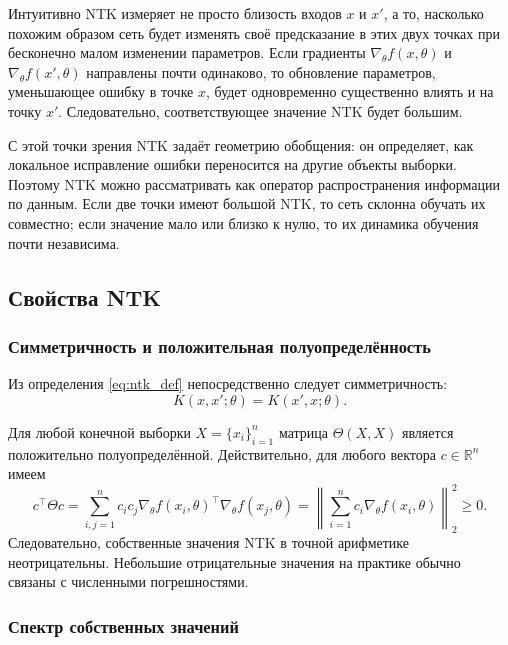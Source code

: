 Интуитивно NTK измеряет не просто близость входов $x$ и $x'$, а то, насколько похожим образом сеть будет изменять своё предсказание в этих двух точках при бесконечно малом изменении параметров. Если градиенты $\nabla_{\theta} f(x,\theta)$ и $\nabla_{\theta} f(x',\theta)$ направлены почти одинаково, то обновление параметров, уменьшающее ошибку в точке $x$, будет одновременно существенно влиять и на точку $x'$. Следовательно, соответствующее значение NTK будет большим.

С этой точки зрения NTK задаёт геометрию обобщения: он определяет, как локальное исправление ошибки переносится на другие объекты выборки. Поэтому NTK можно рассматривать как оператор распространения информации по данным. Если две точки имеют большой NTK, то сеть склонна обучать их совместно; если значение мало или близко к нулю, то их динамика обучения почти независима.

\subsection{Свойства NTK}

\subsubsection{Симметричность и положительная полуопределённость}

Из определения \eqref{eq:ntk_def} непосредственно следует симметричность:
\begin{equation}
    K(x,x';\theta)=K(x',x;\theta).
\end{equation}

Для любой конечной выборки $X=\{x_i\}_{i=1}^{n}$ матрица $\Theta(X,X)$ является положительно полуопределённой. Действительно, для любого вектора $c \in \mathbb{R}^n$ имеем
\begin{equation}
    c^{\top}\Theta c
    =\sum_{i,j=1}^{n}c_i c_j \nabla_{\theta}f(x_i,\theta)^{\top}\nabla_{\theta}f(x_j,\theta)
    =\left\|\sum_{i=1}^{n} c_i \nabla_{\theta}f(x_i,\theta)\right\|_2^2 \ge 0.
\end{equation}
Следовательно, собственные значения NTK в точной арифметике неотрицательны. Небольшие отрицательные значения на практике обычно связаны с численными погрешностями.

\subsubsection{Спектр собственных значений}


